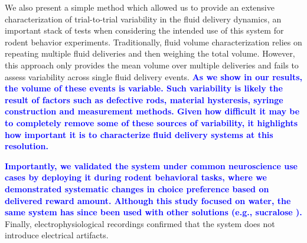 We also present a simple method which allowed us to provide an extensive characterization of trial-to-trial variability in the fluid delivery dynamics, an important stack of tests when considering the intended use of this system for rodent behavior experiments. Traditionally, fluid volume characterization relies on repeating multiple fluid deliveries and then weighing the total volume. However, this approach only provides the mean volume over multiple deliveries and fails to assess variability across single fluid delivery events. \textcolor{blue}{\textbf{As we show in our results, the volume of these events is variable. Such variability is likely the result of factors such as defective rods, material hysteresis, syringe construction and measurement methods. Given how difficult it may be to completely remove some of these sources of variability, it highlights how important it is to characterize fluid delivery systems at this resolution.}}

\textcolor{blue}{\textbf{Importantly, we validated the system under common neuroscience use cases by deploying it during rodent behavioral tasks, where we demonstrated systematic changes in choice preference based on delivered reward amount. Although this study focused on water, the same system has since been used with other solutions (e.g., sucralose \citep{SilvaENEURO.0189-24.2024}).}} Finally, electrophysiological recordings confirmed that the system does not introduce electrical artifacts.




 





